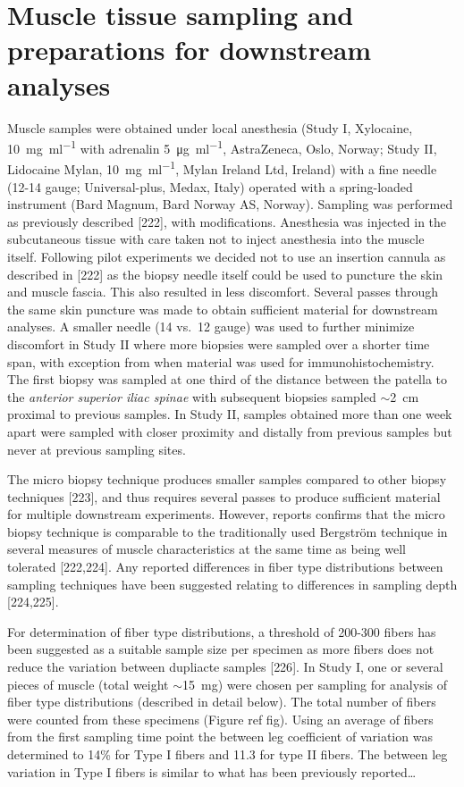 \documentclass[twoside,10pt]{gihclass} %
\begin{document}
\hypertarget{muscle-tissue-sampling-and-preparations-for-downstream-analyses}{%
\section{Muscle tissue sampling and preparations for downstream analyses}\label{muscle-tissue-sampling-and-preparations-for-downstream-analyses}}

Muscle samples were obtained under local anesthesia (Study I, Xylocaine,
\SI{10}{\mg\per\ml} with adrenalin \SI{5}{\micro\gram\per\ml},
AstraZeneca, Oslo, Norway; Study II, Lidocaine Mylan,
\SI{10}{\mg\per\ml}, Mylan Ireland Ltd, Ireland) with a fine needle
(12-14 gauge; Universal-plus, Medax, Italy) operated with a
spring-loaded instrument (Bard Magnum, Bard Norway AS, Norway). Sampling
was performed as previously described
{[}222{]}, with
modifications. Anesthesia was injected in the subcutaneous tissue with
care taken not to inject anesthesia into the muscle itself. Following
pilot experiments we decided not to use an insertion cannula as
described in {[}222{]} as the biopsy needle itself could be used to
puncture the skin and muscle fascia. This also resulted in less
discomfort. Several passes through the same skin puncture was made to
obtain sufficient material for downstream analyses. A smaller needle (14
vs.~12 gauge) was used to further minimize discomfort in Study II where
more biopsies were sampled over a shorter time span, with exception from
when material was used for immunohistochemistry. The first biopsy was
sampled at one third of the distance between the patella to the
\emph{anterior superior iliac spinae} with subsequent biopsies sampled
\(\sim\)\SI{2}{cm} proximal to previous samples. In Study II, samples
obtained more than one week apart were sampled with closer proximity and
distally from previous samples but never at previous sampling sites.

The micro biopsy technique produces smaller samples compared to other
biopsy techniques
{[}223{]}, and thus
requires several passes to produce sufficient material for multiple
downstream experiments. However, reports confirms that the micro biopsy
technique is comparable to the traditionally used Bergström technique in
several measures of muscle characteristics at the same time as being
well tolerated {[}222,224{]}. Any reported differences in fiber type
distributions between sampling techniques have been suggested relating
to differences in sampling depth {[}224,225{]}.

For determination of fiber type distributions, a threshold of 200-300
fibers has been suggested as a suitable sample size per specimen as more
fibers does not reduce the variation between dupliacte samples
{[}226{]}.
In Study I, one or several pieces of muscle (total weight
\(\sim\)\SI{15}{mg}) were chosen per sampling for analysis of fiber type
distributions (described in detail below). The total number of fibers
were counted from these specimens (Figure ref fig). Using an average of
fibers from the first sampling time point the between leg coefficient of
variation was determined to 14\% for Type I fibers and 11.3 for type II
fibers. The between leg variation in Type I fibers is similar to what
has been previously reported\ldots{}
\end{document}
